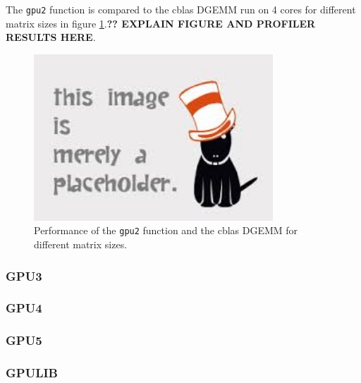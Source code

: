 The \texttt{gpu2} function is compared to the cblas DGEMM run on 4 cores for different matrix sizes in figure \ref{fig:gpu2_DGEMM}.\textbf{?? EXPLAIN FIGURE AND PROFILER RESULTS HERE}.

\begin{figure}
\centering
\includegraphics[width = 0.8\textwidth]{fig/placeholder.jpg}
\caption{Performance of the \texttt{gpu2} function and the cblas DGEMM for different matrix sizes.}
\label{fig:gpu2_DGEMM}
\end{figure}

\subsubsection{GPU3}


\subsubsection{GPU4}


\subsubsection{GPU5}

\subsubsection{GPULIB}
